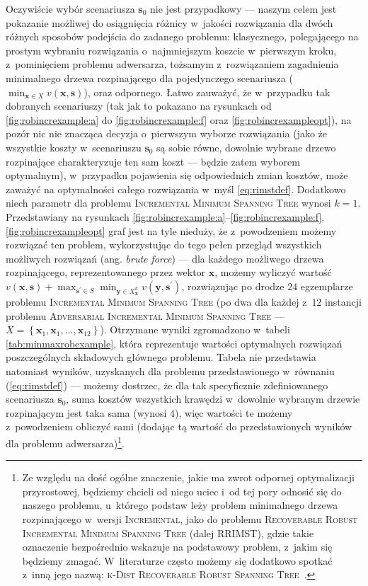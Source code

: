 Oczywiście wybór scenariusza $\textbf{s}_{0}$ nie jest przypadkowy --- naszym celem jest pokazanie możliwej do osiągnięcia różnicy w~jakości rozwiązania dla dwóch różnych sposobów podejścia do zadanego problemu: klasycznego, polegającego na prostym wybraniu rozwiązania o~najmniejszym koszcie w~pierwszym kroku, z~pominięciem problemu adwersarza, tożsamym z~rozwiązaniem zagadnienia minimalnego drzewa rozpinającego dla pojedynczego scenariusza ($\min_{\textbf{x} \in X} v \left( \textbf{x}, \textbf{s} \right)$), oraz odpornego. 
Łatwo zauważyć, że w~przypadku tak dobranych scenariuszy (tak jak to pokazano na rysunkach od \ref{fig:robincrexample:a} do \ref{fig:robincrexample:f} oraz \ref{fig:robincrexampleopt}), na pozór nic nie znacząca decyzja o~pierwszym wyborze rozwiązania (jako że wszystkie koszty w~scenariuszu $\textbf{s}_{0}$ są sobie równe, dowolnie wybrane drzewo rozpinające charakteryzuje ten sam koszt --- będzie zatem wyborem optymalnym), w~przypadku pojawienia się odpowiednich zmian kosztów, może zaważyć na optymalności całego rozwiązania w~myśl \ref{eq:rimstdef}.
Dodatkowo niech parametr dla problemu \textsc{Incremental Minimum Spanning Tree} wynosi $k = 1$.
Przedstawiany na rysunkach \ref{fig:robincrexample:a}--\ref{fig:robincrexample:f}, \ref{fig:robincrexampleopt} graf jest na tyle nieduży, że z~powodzeniem możemy rozwiązać ten problem, wykorzystując do tego pełen przegląd wszystkich możliwych rozwiązań (ang. \textit{brute force}) --- dla każdego możliwego drzewa rozpinającego, reprezentowanego przez wektor $\textbf{x}$, możemy wyliczyć wartość $v \left( \textbf{x}, \textbf{s} \right) + \max_{\textbf{s}^{\prime} \in S} \min_{\textbf{y} \in X^{k}_{\textbf{x}}} v \left( \textbf{y}, \textbf{s}^{\prime} \right)$, rozwiązując po drodze $24$ egzemplarze problemu \textsc{Incremental Minimum Spanning Tree} (po dwa dla każdej z~$12$ instancji problemu \textsc{Adversarial Incremental Minimum Spanning Tree} --- $X = \left\{ \textbf{x}_{1}, \textbf{x}_{1}, \dots, \textbf{x}_{12} \right\}$).
Otrzymane wyniki zgromadzono w~tabeli \ref{tab:minmaxrobexample}, która reprezentuje wartości optymalnych rozwiązań poszczególnych składowych głównego problemu.
Tabela nie przedstawia natomiast wyników, uzyskanych dla problemu przedstawionego w~równaniu (\ref{eq:rimstdef}) --- możemy dostrzec, że dla tak specyficznie zdefiniowanego scenariusza $\textbf{s}_{0}$, suma kosztów wszystkich krawędzi w~dowolnie wybranym drzewie rozpinającym jest taka sama (wynosi $4$), więc wartości te możemy z~powodzeniem obliczyć sami (dodając tą wartość do przedstawionych wyników dla problemu adwersarza)\footnote{
	Ze względu na dość ogólne znaczenie, jakie ma zwrot odpornej optymalizacji przyrostowej, będziemy chcieli od niego uciec i~od tej pory odnosić się do naszego problemu, u~którego podstaw leży problem minimalnego drzewa rozpinającego w~wersji \textsc{Incremental}, jako do problemu \textsc{Recoverable Robust Incremental Minimum Spanning Tree} (dalej \textsc{RRIMST}), gdzie takie oznaczenie bezpośrednio wskazuje na podstawowy problem, z~jakim się będziemy zmagać.
	W~literaturze często możemy się dodatkowo spotkać z~inną jego nazwą: \textsc{k-Dist Recoverable Robust Spanning Tree}~\cite{Kasperski2014}.
}.

